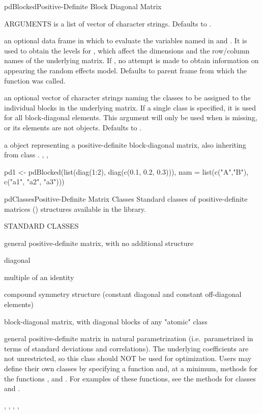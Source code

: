\documentclass[pdftex]{article} \usepackage{url,graphicx}
\begin{document}
\begin{Helpfile}{pdBlocked}{Positive-Definite Block Diagonal Matrix}
\begin{Argument}{ARGUMENTS}
 is a list of vector of character strings. Defaults to 
.
\item[\Co{data:}]
an optional data frame in which to evaluate the variables
named in  and . It is used to
obtain the levels for , which affect the
dimensions and the row/column names of the underlying matrix. If
, no attempt is made to obtain information on 
 appearing the random effects model. Defaults to parent
frame from which the function was called.
\item[\Co{pdClass:}]
an optional vector of character strings naming the
 classes to be assigned to the individual blocks in the
underlying matrix. If a single class is specified, it is used for all
block-diagonal elements. This argument will only be used when
 is missing, or its elements are not 
objects. Defaults to .
\end{Argument}
a  object representing a positive-definite
block-diagonal matrix, also inheriting from class .
, ,
\need 15pt
\vspace{-16pt} 
\begin{Example}
pd1 <- pdBlocked(list(diag(1:2), diag(c(0.1, 0.2, 0.3))),
                 nam = list(c("A","B"), c("a1", "a2", "a3")))
\end{Example}
\end{Helpfile}
\begin{Helpfile}{pdClasses}{Positive-Definite Matrix Classes}
Standard classes of positive-definite matrices ()
structures  available in the  library.
\begin{Argument}{STANDARD CLASSES}
\item[\Co{pdSymm:}]
general positive-definite matrix, with no additional
structure
\item[\Co{pdDiag:}]
diagonal
\item[\Co{pdIdent:}]
multiple of an identity
\item[\Co{pdCompSymm:}]
compound symmetry structure (constant diagonal and
constant off-diagonal elements)
\item[\Co{pdBlocked:}]
block-diagonal matrix, with diagonal blocks of any
"atomic"  class
\item[\Co{pdNatural:}]
general positive-definite matrix in natural
parametrization (i.e.\ parametrized in terms of standard deviations
and correlations). The underlying coefficients are not unrestricted,
so this class should NOT be used for optimization.
 Users may define their own  classes by specifying a
 function and, at a minimum, methods for the
functions ,  and . For
examples of these functions, see the methods for classes 
and .
\end{Argument}
, ,
, , 
\end{Helpfile}
\end{document}
